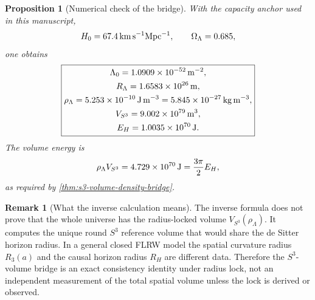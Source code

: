 \documentclass[aps,prd,reprint,nofootinbib,superscriptaddress,floatfix]{revtex4-2}
\numberwithin{equation}{section}
\theoremstyle{definition}
\newtheorem{remark}{Remark}[section]
\theoremstyle{plain}
\newtheorem{proposition}{Proposition}[section]
\begin{document}
\begin{proposition}[Numerical check of the bridge]
With the capacity anchor used in this manuscript,
\[
H_0=67.4\,{\rm km\,s^{-1}Mpc^{-1}},\qquad
\Omega_\Lambda=0.685,
\]
one obtains
\[
\boxed{
\begin{gathered}
\Lambda_0=1.0909\times10^{-52}\,{\rm m}^{-2},\\
R_\Lambda=1.6583\times10^{26}\,{\rm m},\\
\rho_\Lambda=5.253\times10^{-10}\,{\rm J\,m^{-3}}
=5.845\times10^{-27}\,{\rm kg\,m^{-3}},\\
V_{S^3}=9.002\times10^{79}\,{\rm m^3},\\
E_H=1.0035\times10^{70}\,{\rm J}.
\end{gathered}}
\]
The volume energy is
\[
\rho_\Lambda V_{S^3}=4.729\times10^{70}\,{\rm J}
=
\frac{3\pi}{2}E_H,
\]
as required by \cref{thm:s3-volume-density-bridge}.
\end{proposition}

\begin{remark}[What the inverse calculation means]
The inverse formula does not prove that the whole universe has the
radius-locked volume \(V_{S^3}(\rho_\Lambda)\).  It computes the unique
round \(S^3\) reference volume that would share the de Sitter horizon radius.
In a general closed FLRW model the spatial curvature radius \(R_3(a)\) and
the causal horizon radius \(R_H\) are different data.  Therefore the
\(S^3\)-volume bridge is an exact consistency identity under radius lock, not
an independent measurement of the total spatial volume unless the lock is
derived or observed.
\end{remark}
\end{document}
